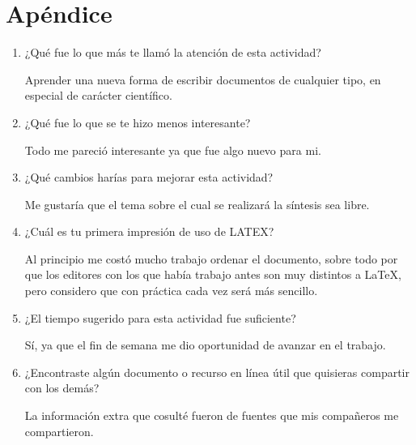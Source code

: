 \documentclass{article} %
\begin{document}
\section{Apéndice}
\begin{enumerate}
\item¿Qué fue lo que más te llamó la atención de esta actividad?

Aprender una nueva forma de escribir documentos de cualquier tipo, en especial de carácter científico.

\item¿Qué fue lo que se te hizo menos interesante?

Todo me pareció interesante ya que fue algo nuevo para mi.

\item¿Qué cambios harías para mejorar esta actividad?

Me gustaría que el tema sobre el cual se realizará la síntesis sea libre.

\item¿Cuál es tu primera impresión de uso de LATEX?

Al principio me costó mucho trabajo ordenar el documento, sobre todo por que los editores con los que había trabajo antes son muy distintos a LaTeX, pero considero que con práctica cada vez será más sencillo.

\item¿El tiempo sugerido para esta actividad fue suficiente? 

Sí, ya que el fin de semana me dio oportunidad de avanzar en el trabajo.

\item¿Encontraste algún documento o recurso en línea útil que quisieras compartir con los demás?

La información extra que cosulté fueron de fuentes que mis compañeros me compartieron.
\end{enumerate}
\end{document}
